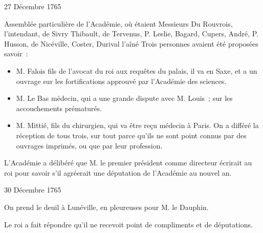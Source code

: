 \begin{diary}{27 Décembre 1765}{}
        
                         Assemblée particulière de l'Académie, où
                           étaient Messieurs
                           Du Rouvrois, l'intendant, de
                              Sivry
                           Thibault, de Tervenus, P.
                              Leslie, Bagard,
                              Cupers,
                           André, P.
                              Husson, de Nicéville,
                              Coster, Durival l'aîné
                           Trois personnes avaient été proposées savoir : \begin{itemize}\item 
                                 M. Falois fils de l'avocat du roi aux
                                    requêtes du
                                    palais, il va en Saxe, et a un ouvrage
                                    sur les
                                    fortifications
                                 approuvé par l'Académie des sciences. \item 
                                 M. Le Bas médecin, qui a
                                 une grande dispute
                                 avec M. Louis ; sur les accouchements prématurés. \item 
                                 M. Mittié, fils du chirurgien, qui va être
                                 reçu médecin à Paris.
                                 On a différé la réception de tous trois, sur tout parce qu'ils ne sont
                                 point connus par des ouvrages imprimés,
                                 ou que par leur profession. \end{itemize}
                        \bigskip
        
        
                        
                           L'Académie a délibéré que M. le premier président
                           comme directeur écrirait au roi pour
                           savoir s'il agréerait une députation de
                           l'Académie au nouvel an. \bigskip
        
        
                     \end{diary}

                     \begin{diary}{30 Décembre 1765}{}
                        
                         On prend le deuil à Lunéville, en pleureuses
                           pour M. le Dauphin. \bigskip
        
        
                        
                           Le roi a fait répondre qu'il
                           ne recevoit
                           point de compliments et de députations. \bigskip
        
        
                     \end{diary}


